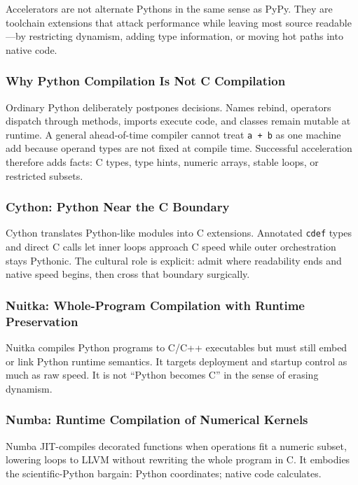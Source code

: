 \documentclass[a4paper,twoside]{report}
\begin{document}
Accelerators are not alternate Pythons in the same sense as PyPy. They are toolchain extensions that attack performance while leaving most source readable---by restricting dynamism, adding type information, or moving hot paths into native code.

\subsubsection{Why Python Compilation Is Not C Compilation}

Ordinary Python deliberately postpones decisions. Names rebind, operators dispatch through methods, imports execute code, and classes remain mutable at runtime. A general ahead-of-time compiler cannot treat \texttt{a + b} as one machine add because operand types are not fixed at compile time. Successful acceleration therefore adds facts: C types, type hints, numeric arrays, stable loops, or restricted subsets.

\subsubsection{Cython: Python Near the C Boundary}

Cython translates Python-like modules into C extensions. Annotated \texttt{cdef} types and direct C calls let inner loops approach C speed while outer orchestration stays Pythonic. The cultural role is explicit: admit where readability ends and native speed begins, then cross that boundary surgically.

\subsubsection{Nuitka: Whole-Program Compilation with Runtime Preservation}

Nuitka compiles Python programs to C/C++ executables but must still embed or link Python runtime semantics. It targets deployment and startup control as much as raw speed. It is not ``Python becomes C'' in the sense of erasing dynamism.

\subsubsection{Numba: Runtime Compilation of Numerical Kernels}

Numba JIT-compiles decorated functions when operations fit a numeric subset, lowering loops to LLVM without rewriting the whole program in C. It embodies the scientific-Python bargain: Python coordinates; native code calculates.
\end{document}
